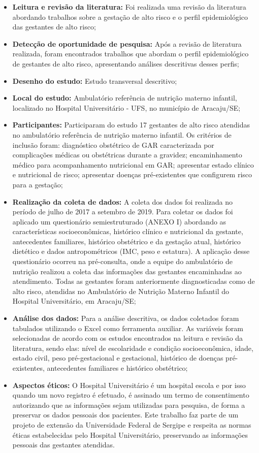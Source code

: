 \begin{itemize}
    \item \textbf{Leitura e revisão da literatura:} Foi realizada uma revisão da literatura abordando trabalhos sobre a gestação de alto risco e o perfil epidemiológico das gestantes de alto risco;
    \item \textbf{Detecção de oportunidade de pesquisa:} Após a revisão de literatura realizada, foram encontrados trabalhos que abordam o perfil epidemiológico de gestantes de alto risco, apresentando análises descritivas desses perfis;
    \item \textbf {Desenho do estudo:} Estudo transversal descritivo;
    \item \textbf {Local do estudo:} Ambulatório referência de nutrição materno infantil, localizado no Hospital Universitário - UFS, no município de Aracaju/SE;
    \item \textbf {Participantes:} Participaram do estudo 17 gestantes de alto risco atendidas no ambulatório referência de nutrição materno infantil. Os critérios de inclusão foram: diagnóstico obstétrico de \ac{GAR} caracterizada por complicações médicas ou obstétricas durante a gravidez; encaminhamento médico para acompanhamento nutricional em \ac{GAR}; apresentar estado clínico e nutricional de risco; apresentar doenças pré-existentes que configurem risco para a gestação;
     \item \textbf {Realização da coleta de dados:} A coleta dos dados foi realizada no período de julho de 2017 a setembro de 2019. Para coletar os dados foi aplicado um questionário semiestruturado (ANEXO I) abordando as características socioeconômicas, histórico clínico e nutricional da gestante, antecedentes familiares, histórico obstétrico e da gestação atual, histórico dietético e dados antropométricos (IMC, peso e estatura). A aplicação desse questionário ocorreu na pré-consulta, onde a equipe do ambulatório de nutrição realizou a coleta das informações das gestantes encaminhadas ao atendimento. Todas as gestantes foram anteriormente diagnosticadas como de alto risco, atendidas no Ambulatório de Nutrição Materno Infantil do Hospital Universitário, em Aracaju/SE;
     \item \textbf {Análise dos dados:} Para a análise descritiva, os dados coletados foram tabulados utilizando o Excel como ferramenta auxiliar. As variáveis foram selecionadas de acordo com os estudos encontrados na leitura e revisão da literatura, sendo elas: nível de escolaridade e condição socioeconômica, idade, estado civil, peso pré-gestacional e gestacional, histórico de doenças pré-existentes, antecedentes familiares e histórico obstétrico;
     \item \textbf {Aspectos éticos:} O Hospital Universitário é um hospital escola e por isso quando um novo registro é efetuado, é assinado um termo de consentimento autorizando que as informações sejam utilizadas para pesquisa, de forma a preservar os dados pessoais dos pacientes. Este trabalho faz parte de um projeto de extensão da Universidade Federal de Sergipe e  respeita as normas éticas estabelecidas pelo Hospital Universitário, preservando as informações pessoais das gestantes atendidas.
\end{itemize}

